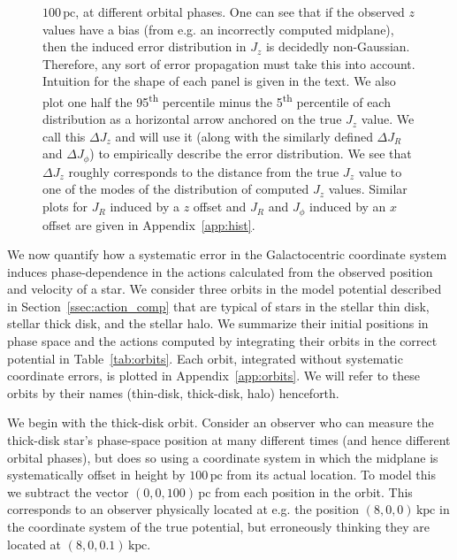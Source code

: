 \documentclass[twocolumn]{aastex62}
\newcommand{\pc}{\text{pc}}
\newcommand{\kpc}{\text{kpc}}
\newcommand{\uth}{\textsuperscript{th}}
\begin{document}
\begin{figure}
{$100\,\pc$, at different orbital phases. One can see that if the observed $z$ values have a bias (from e.g.
an incorrectly computed midplane), then the induced error distribution in
$J_z$ is decidedly non-Gaussian. Therefore, any sort of error propagation must
take this into account. Intuition for the shape of each panel is given in the
text. We also plot one half the 95\uth{} percentile minus the 5\uth{}
percentile of each distribution as a horizontal arrow anchored on the true
$J_z$ value. We call this $\Delta J_z$ and will use it (along with the
similarly defined $\Delta J_R$ and $\Delta J_{\phi}$) to empirically describe
the error distribution. We see that $\Delta J_z$ roughly corresponds to the
distance from the true $J_z$ value to one of the modes of the distribution of
computed $J_z$ values. Similar plots for $J_R$ induced by a $z$ offset and
$J_R$ and $J_{\phi}$ induced by an $x$ offset are given in
Appendix~\ref{app:hist}.}
\label{fig:Jz_hist}
\end{figure}

We now quantify how a systematic error in the Galactocentric coordinate system
induces phase-dependence in the actions calculated from the observed position and velocity of a star. We consider
three orbits in the model potential described in
Section~\ref{ssec:action_comp} that are typical of stars in the stellar thin
disk, stellar thick disk, and the stellar halo. We summarize their initial
positions in phase space and the actions computed by integrating their orbits
in the correct potential in Table~\ref{tab:orbits}. Each orbit, integrated
without systematic coordinate errors, is plotted in Appendix~\ref{app:orbits}.
We will refer to these orbits by their names (thin-disk, thick-disk, halo)
henceforth.

We begin with the thick-disk orbit. Consider an observer who can
measure the thick-disk star's phase-space position at many different times
(and hence different orbital phases), but does so using a
coordinate system in which the midplane is systematically offset in height by
$100\,\pc$ from its actual location. To model this we subtract the vector $(0, 0,
100)\,\pc$ from each position in the orbit. This corresponds to an
observer physically located at e.g. the position $(8, 0, 0)\,\kpc$ in the
coordinate system of the true potential, but erroneously thinking they are
located at $(8, 0, 0.1)\,\kpc$.
\end{document}
